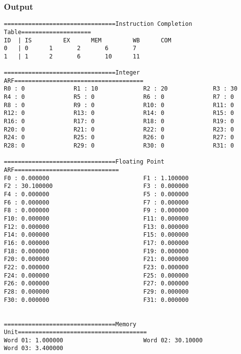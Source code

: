\documentclass[12pt]{article}
\begin{document}
\subsubsection*{Output}
\begin{verbatim}
================================Instruction Completion Table====================
ID	| IS		 EX		 MEM		 WB		 COM
0	| 0		 1		 2		 6		 7
1	| 1		 2		 6		 10		 11

================================Integer ARF=====================================
R0 : 0              R1 : 10             R2 : 20             R3 : 30             
R4 : 0              R5 : 0              R6 : 0              R7 : 0              
R8 : 0              R9 : 0              R10: 0              R11: 0              
R12: 0              R13: 0              R14: 0              R15: 0              
R16: 0              R17: 0              R18: 0              R19: 0              
R20: 0              R21: 0              R22: 0              R23: 0              
R24: 0              R25: 0              R26: 0              R27: 0              
R28: 0              R29: 0              R30: 0              R31: 0              

================================Floating Point ARF==============================
F0 : 0.000000                           F1 : 1.100000                           
F2 : 30.100000                          F3 : 0.000000                           
F4 : 0.000000                           F5 : 0.000000                           
F6 : 0.000000                           F7 : 0.000000                           
F8 : 0.000000                           F9 : 0.000000                           
F10: 0.000000                           F11: 0.000000                           
F12: 0.000000                           F13: 0.000000                           
F14: 0.000000                           F15: 0.000000                           
F16: 0.000000                           F17: 0.000000                           
F18: 0.000000                           F19: 0.000000                           
F20: 0.000000                           F21: 0.000000                           
F22: 0.000000                           F23: 0.000000                           
F24: 0.000000                           F25: 0.000000                           
F26: 0.000000                           F27: 0.000000                           
F28: 0.000000                           F29: 0.000000                           
F30: 0.000000                           F31: 0.000000                           


================================Memory Unit=====================================
Word 01: 1.000000                       Word 02: 30.10000                       
Word 03: 3.400000  
\end{verbatim}
\end{document}
